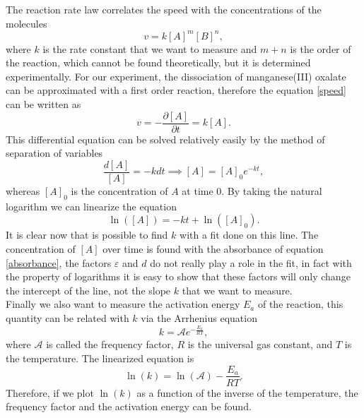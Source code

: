 \documentclass[a4paper,10pt]{article}
\begin{document}
The reaction rate law correlates the speed with the concentrations of the molecules
\begin{equation}\label{speed}v = k [A]^m [B]^n,\end{equation}
where $k$ is the rate constant that we want to measure and $m+n$ is the order of the reaction, which cannot be found theoretically, but it is determined experimentally. For our experiment, the dissociation of manganese(III) oxalate can be approximated with a first order reaction, therefore the equation \eqref{speed} can be written as
\[v = -\frac{\partial[A]}{\partial t} = k [A].\]
This differential equation can be solved relatively easily by the method of separation of variables
\[\frac{d[A]}{[A]} = -kdt \implies [A] = [A]_0 e^{-kt},\]
whereas $[A]_0$ is the concentration of $A$ at time 0. By taking the natural logarithm we can linearize the equation
\[\ln([A]) = -kt + \ln([A]_0).\]
It is clear now that is possible to find $k$ with a fit done on this line. The concentration of $[A]$ over time is found with the absorbance of equation \eqref{absorbance}, the factors $\varepsilon$ and $d$ do not really play a role in the fit, in fact with the property of logarithms it is easy to show that these factors will only change the intercept of the line, not the slope $k$ that we want to measure.\\
Finally we also want to measure the activation energy $E_a$ of the reaction, this quantity can be related with $k$ via the Arrhenius equation
\[k = \mathcal{A} e^{-\frac{E_a}{RT}},\]
where $\mathcal{A}$ is called the frequency factor, $R$ is the universal gas constant, and $T$ is the temperature. The linearized equation is
\[\ln(k) = \ln(\mathcal{A}) - \frac{E_a}{RT}.\]
Therefore, if we plot $\ln(k)$ as a function of the inverse of the temperature, the frequency factor and the activation energy can be found.
\end{document}
